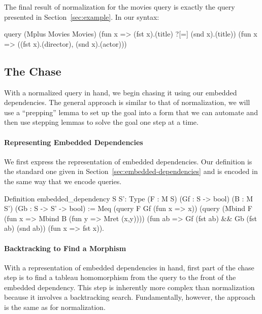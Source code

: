 \documentclass[preprint]{sigplanconf}
\begin{document}
The final result of normalization for the movies query is exactly the query presented in Section~\ref{sec:example}.
In our syntax:
\begin{coq}
query (Mplus Movies Movies)
      (fun x => (fst x).(title) ?[=] (snd x).(title))
      (fun x => ((fst x).(director), (snd x).(actor)))
\end{coq}

\subsection{The Chase}

With a normalized query in hand, we begin chasing it using our embedded dependencies.
The general approach is similar to that of normalization, we will use a ``prepping'' lemma to set up the goal into a form that we can automate and then use stepping lemmas to solve the goal one step at a time.

\paragraph{Representing Embedded Dependencies}
We first express the representation of embedded dependencies.
Our definition is the standard one given in Section~\ref{sec:embedded-dependencies} and is encoded in the same way that we encode queries.
\begin{coq}
Definition embedded_dependency {S S': Type}
  (F : M S) (Gf : S -> bool) (B : M S') (Gb : S -> S' -> bool) :=
  Meq (query F Gf (fun x => x))
      (query (Mbind F (fun x => Mbind B (fun y => Mret (x,y))))
             (fun ab => Gf (fst ab) && Gb (fst ab) (snd ab))
             (fun x => fst x)).
\end{coq}




\paragraph{Backtracking to Find a Morphism}
With a representation of embedded dependencies in hand, first part of the chase step is to find a tableau homomorphism from the query to the front of the embedded dependency.
This step is inherently more complex than normalization because it involves a backtracking search.
Fundamentally, however, the approach is the same as for normalization.
\end{document}
